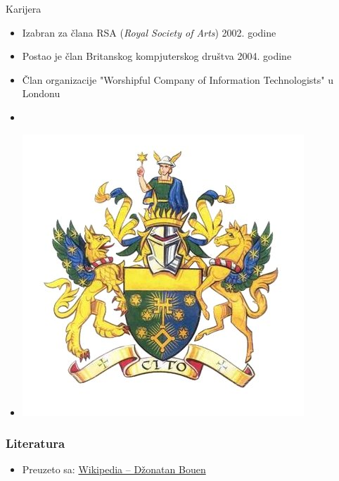 \documentclass{beamer}
\begin{document}
\begin{frame}{Karijera}
    \begin{itemize}
    		\item Izabran za člana RSA (\textit{Royal Society of Arts}) 2002. godine
    		\item Postao je član Britanskog kompjuterskog društva 2004. godine
    		\item Član organizacije "Worshipful Company of Information Technologists" u Londonu
    		\item[]
    		\item[] \begin{center} \includegraphics[scale=0.25]{7Nb1Hw2A_400x400.jpg} \end{center}
    \end{itemize}
\end{frame}

\begin{frame}[fragile]\frametitle{Literatura}
	\begin{itemize}
		\item Preuzeto sa: \href {https://sr.wikipedia.org/wiki/%D0%8F%D0%BE%D0%BD%D0%B0%D1%82%D0%B0%D0%BD_%D0%91%D0%BE%D1%83%D0%B5%D0%BD} {Wikipedia -- Džonatan Bouen}
	\end{itemize}
\end{frame}

\begin{frame}
    \begin{itemize}
    \end{itemize}
\end{frame}
\end{document}
